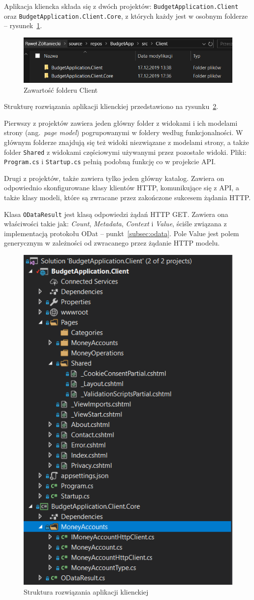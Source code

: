 Aplikacja kliencka składa się z dwóch projektów: \texttt{BudgetApplication.Client} oraz \texttt{BudgetApplication.Client.Core}, z których każdy jest w osobnym folderze -- rysunek~\ref{fig:fiz-client-1}. 

\begin{figure}[t]
	\centering
	\includegraphics[width=.7\linewidth]{rys04/struktura-fizyczna-client-1.PNG}
	\caption{Zawartość folderu Client}
	\label{fig:fiz-client-1}
\end{figure}

Strukturę rozwiązania aplikacji klienckiej przedstawiono na rysunku~\ref{fig:fiz-client-2}.

Pierwszy z projektów zawiera jeden główny folder z widokami i ich modelami strony (ang.~\emph{page model}) pogrupowanymi w foldery według funkcjonalności. W głównym folderze znajdują się też widoki niezwiązane z modelami strony, a także folder \texttt{Shared} z widokami częściowymi używanymi przez pozostałe widoki. Pliki: \texttt{Program.cs} i \texttt{Startup.cs} pełnią podobną funkcję co w projekcie API.

Drugi z projektów, także zawiera tylko jeden główny katalog. Zawiera on odpowiednio skonfigurowane klasy klientów HTTP, komunikujące się z API, a także klasy modeli, które są zwracane przez zakończone sukcesem żądania HTTP.

Klasa \texttt{ODataResult} jest klasą odpowiedzi żądań HTTP GET. Zawiera ona właściwości takie jak: \emph{Count}, \emph{Metadata}, \emph{Context} i \emph{Value}, ściśle związana z implementacją protokołu ODat -- punkt~\ref{subsec:odata}. Pole Value jest polem generycznym w zależności od zwracanego przez żądanie HTTP modelu. 

\begin{figure}[t]
	\centering
	\includegraphics[width=.5\linewidth]{rys04/struktura-fizyczna-client-2.PNG}
	\caption{Struktura rozwiązania aplikacji klienckiej}
	\label{fig:fiz-client-2}
\end{figure}


